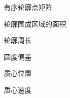 \begin{denotation}[3.0cm]
\item[$\boldsymbol{Q}^{\Gamma}$] 有序轮廓点矩阵
\item[$A$] 轮廓围成区域的面积
\item[$L_{\Gamma}$] 轮廓周长
\item[$D_{\mathrm c}$] 圆度偏差
\item[$\boldsymbol{x}_{\mathrm c}$] 质心位置
\item[$\boldsymbol{v}_{\mathrm c}$] 质心速度

\end{denotation}
